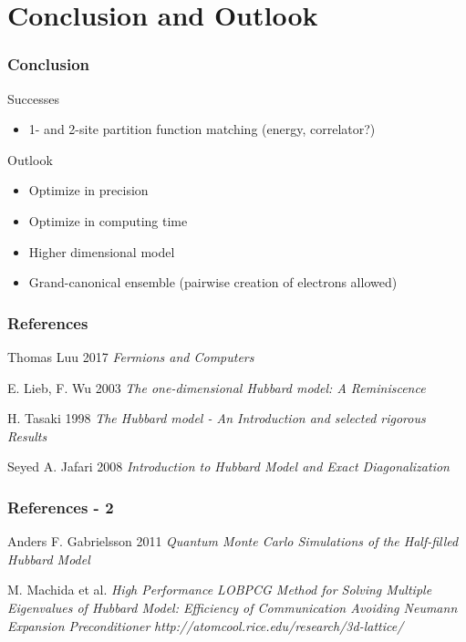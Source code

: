 \documentclass{beamer}
\begin{document}
\section[Conclusion and Outlook]{Conclusion and Outlook}
\begin{frame}
\frametitle{Conclusion}
\begin{block}{Successes}
\begin{itemize}
\item 1- and 2-site partition function matching (energy, correlator?)
\end{itemize}
\end{block}

\begin{block}{Outlook}
	\begin{itemize}
		\item Optimize in precision
		\item Optimize in computing time
		\item Higher dimensional model
		\item Grand-canonical ensemble (pairwise creation of electrons allowed)
	\end{itemize}
\end{block}
\end{frame}

\appendix

\begin{thebibliography}{}
\begin{frame}
\frametitle{References}	
	Thomas Luu 2017
	\textit{Fermions and Computers}
	
	E. Lieb, F. Wu 2003
	\textit{The one-dimensional Hubbard model: A Reminiscence}
	
	H. Tasaki 1998
	\textit{The Hubbard model - An Introduction and selected rigorous Results}
	
	Seyed A. Jafari 2008
	\textit{Introduction to Hubbard Model and Exact Diagonalization}	
\end{frame}	
\begin{frame}
\frametitle{References - 2}
Anders F. Gabrielsson 2011
\textit{Quantum Monte Carlo Simulations of
	the Half-filled Hubbard Model}

M. Machida et al. \textit{High Performance LOBPCG Method for Solving Multiple Eigenvalues of Hubbard Model: Efficiency of Communication Avoiding Neumann Expansion Preconditioner}
\textit{http://atomcool.rice.edu/research/3d-lattice/}
\end{frame}
\end{thebibliography}
\end{document}
